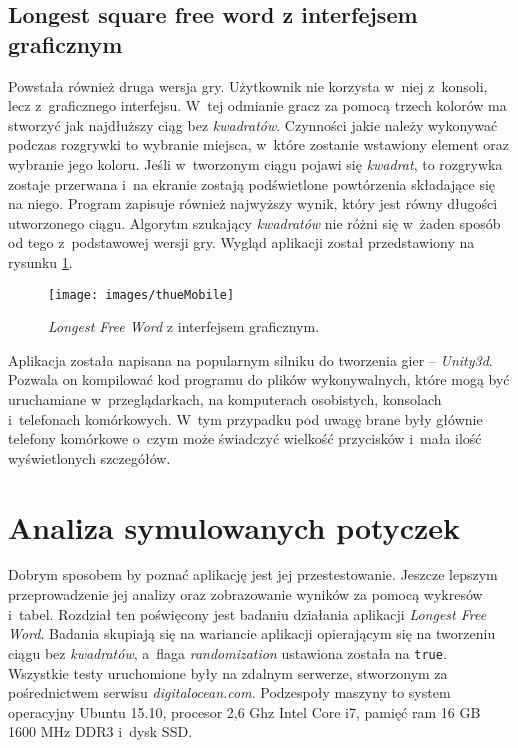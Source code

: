 \documentclass[document]{xmgr}
\begin{document}
\section{Longest square free word z interfejsem graficznym}
Powstała również druga wersja gry. Użytkownik nie korzysta w~niej z~konsoli, lecz z~graficznego interfejsu. W~tej odmianie gracz za pomocą trzech kolorów ma stworzyć jak najdłuższy ciąg bez \emph{kwadratów}. Czynności jakie należy wykonywać podczas rozgrywki to wybranie miejsca, w~które zostanie wstawiony element oraz wybranie jego koloru. Jeśli w~tworzonym ciągu pojawi się \emph{kwadrat}, to rozgrywka zostaje przerwana i~na ekranie zostają podświetlone powtórzenia składające się na niego. Program zapisuje również najwyższy wynik, który jest równy długości utworzonego ciągu. Algorytm szukający \emph{kwadratów} nie różni się w~żaden sposób od tego z~podstawowej wersji gry. Wygląd aplikacji został przedstawiony na rysunku \ref{fig:thueMobile}.

\begin{figure}[tbh]
    \centering
    \caption{\emph{Longest Free Word} z interfejsem graficznym.}
    \texttt{[image: images/thueMobile]}
    \label{fig:thueMobile}
\end{figure}

Aplikacja została napisana na popularnym silniku do tworzenia gier -- \emph{Unity3d}. Pozwala on kompilować kod programu do plików wykonywalnych, które mogą być uruchamiane w~przeglądarkach, na komputerach osobistych, konsolach i~telefonach komórkowych. W~tym przypadku pod uwagę brane były głównie telefony komórkowe o~czym może świadczyć wielkość przycisków i~mała ilość wyświetlonych szczegółów.



\chapter{Analiza symulowanych potyczek} 
Dobrym sposobem by poznać aplikację jest jej przestestowanie. Jeszcze lepszym przeprowadzenie jej analizy oraz zobrazowanie wyników za pomocą wykresów i~tabel. Rozdział ten poświęcony jest badaniu działania aplikacji \emph{Longest Free Word}. Badania skupiają się na wariancie aplikacji opierającym się na tworzeniu ciągu bez \emph{kwadratów}, a~flaga \emph{randomization} ustawiona została na \texttt{true}. Wszystkie testy uruchomione były na zdalnym serwerze, stworzonym za pośrednictwem serwisu \emph{digitalocean.com}. Podzespoły maszyny to system operacyjny Ubuntu 15.10, procesor 2,6 Ghz Intel Core i7, pamięć ram 16 GB 1600 MHz DDR3 i~dysk SSD.
\end{document}
